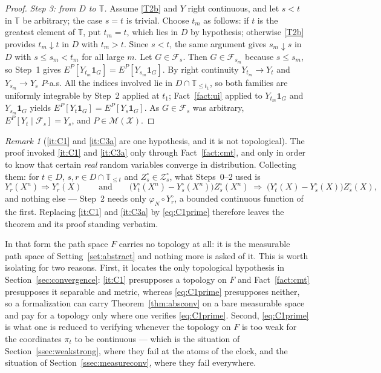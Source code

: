 \documentclass[11pt,a4paper]{article}
\theoremstyle{plain}
\theoremstyle{definition}
\theoremstyle{remark}
\newtheorem{remark}[theorem]{Remark}
\newcommand{\T}{\mathbb{T}}                     %
\newcommand{\Filt}{\mathcal{F}}
\newcommand{\XX}{\mathcal{X}}                  %
\newcommand{\ZZ}{\mathcal{Z}}                  %
\newcommand{\Msol}{\mathcal{M}}
\newcommand{\one}{\mathbf{1}}
\DeclareMathOperator*{\wto}{\Rightarrow}
\begin{document}
\begin{proof}
  \emph{Step 3: from $D$ to $\T$.}
  Assume \eqref{T2b} and $Y$ right continuous, and let $s < t$ in $\T$ be arbitrary; the
  case $s = t$ is trivial.  Choose $t_m$ as follows: if $t$ is the greatest
  element of $\T$, put $t_m = t$, which lies in $D$ by hypothesis; otherwise
  \eqref{T2b} provides $t_m \downarrow t$ in $D$ with $t_m > t$.  Since $s < t$, the same
  argument gives $s_m \downarrow s$ in $D$ with $s \leq s_m < t_m$ for all large
  $m$.  Let $G \in \Filt_s$.  Then $G \in \Filt_{s_m}$ because $s \leq s_m$, so
  Step~1 gives $E^P[Y_{t_m} \one_G] = E^P[Y_{s_m} \one_G]$.  By right continuity
  $Y_{t_m} \to Y_t$ and $Y_{s_m} \to Y_s$ $P$-a.s.  All the indices involved lie
  in $D \cap \T_{\leq t_1}$, so both families are uniformly integrable by Step~2
  applied at $t_1$; Fact~\ref{fact:ui} applied to $Y_{t_m}\one_G$ and
  $Y_{s_m}\one_G$ yields $E^P[Y_t \one_G] = E^P[Y_s \one_G]$.  As
  $G \in \Filt_s$ was arbitrary, $E^P[Y_t \mid \Filt_s] = Y_s$, and
  $P \in \Msol(\XX)$.
\end{proof}

\begin{remark}[\ref{it:C1} and \ref{it:C3a} are one hypothesis, and it is not topological]
  \label{rem:absconvtopfree}
  The proof invoked \ref{it:C1} and \ref{it:C3a} only through
  Fact~\ref{fact:cmt}, and only in order to know that certain \emph{real} random
  variables converge in distribution.  Collecting them: for $t \in D$,
  $s, r \in D \cap \T_{\leq t}$ and $Z^\circ_s \in \ZZ^\circ_s$, what Steps~0--2
  used is
  \begin{equation}
    \label{eq:C1prime}
    Y^\circ_r(X^n) \wto Y^\circ_r(X)
    \qquad\text{and}\qquad
    \bigl( Y^\circ_t(X^n) - Y^\circ_s(X^n) \bigr) Z^\circ_s(X^n)
      \;\wto\; \bigl( Y^\circ_t(X) - Y^\circ_s(X) \bigr) Z^\circ_s(X) ,
  \end{equation}
  and nothing else --- Step~2 needs only $\varphi_N \circ Y^\circ_r$, a bounded
  continuous function of the first.  Replacing \ref{it:C1} and \ref{it:C3a} by
  \eqref{eq:C1prime} therefore leaves the theorem and its proof standing verbatim.

  In that form the path space $F$ carries no topology at all: it is the
  measurable path space of Setting~\ref{set:abstract} and nothing more is asked
  of it.  This is worth isolating for two reasons.  First, it locates the only
  topological hypothesis in Section~\ref{sec:convergence}: \ref{it:C1} presupposes
  a topology on $F$ and Fact~\ref{fact:cmt} presupposes it separable and metric,
  whereas \eqref{eq:C1prime} presupposes neither, so a formalization can carry
  Theorem~\ref{thm:absconv} on a bare measurable space and pay for a topology
  only where one verifies \eqref{eq:C1prime}.  Second, \eqref{eq:C1prime} is what
  one is reduced to verifying whenever the topology on $F$ is too weak for the
  coordinates $\pi_t$ to be continuous --- which is the situation of
  Section~\ref{ssec:weakstrong}, where they fail at the atoms of the clock, and
  the situation of Section~\ref{ssec:measureconv}, where they fail everywhere.
\end{remark}
\end{document}
